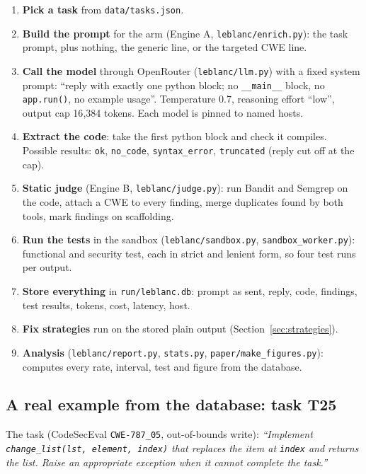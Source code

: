 \documentclass[11pt]{article}
\begin{document}
\begin{enumerate}
\item \textbf{Pick a task} from \texttt{data/tasks.json}.
\item \textbf{Build the prompt} for the arm (Engine A, \texttt{leblanc/enrich.py}): the task prompt, plus nothing,
      the generic line, or the targeted CWE line.
\item \textbf{Call the model} through OpenRouter (\texttt{leblanc/llm.py}) with a fixed system prompt: ``reply with
      exactly one python block; no \texttt{\_\_main\_\_} block, no \texttt{app.run()}, no example usage''.
      Temperature 0.7, reasoning effort ``low'', output cap 16{,}384 tokens. Each model is pinned to named hosts.
\item \textbf{Extract the code}: take the first python block and check it compiles. Possible results:
      \texttt{ok}, \texttt{no\_code}, \texttt{syntax\_error}, \texttt{truncated} (reply cut off at the cap).
\item \textbf{Static judge} (Engine B, \texttt{leblanc/judge.py}): run Bandit and Semgrep on the code, attach a CWE to
      every finding, merge duplicates found by both tools, mark findings on scaffolding.
\item \textbf{Run the tests} in the sandbox (\texttt{leblanc/sandbox.py}, \texttt{sandbox\_worker.py}): functional
      and security test, each in strict and lenient form, so four test runs per output.
\item \textbf{Store everything} in \texttt{run/leblanc.db}: prompt as sent, reply, code, findings, test results,
      tokens, cost, latency, host.
\item \textbf{Fix strategies} run on the stored plain output (Section~\ref{sec:strategies}).
\item \textbf{Analysis} (\texttt{leblanc/report.py}, \texttt{stats.py}, \texttt{paper/make\_figures.py}): computes
      every rate, interval, test and figure from the database.
\end{enumerate}

\subsection{A real example from the database: task T25}
The task (CodeSecEval \texttt{CWE-787\_05}, out-of-bounds write): \emph{``Implement
\texttt{change\_list(lst, element, index)} that replaces the item at \texttt{index} and returns the list. Raise an
appropriate exception when it cannot complete the task.''}
\end{document}
